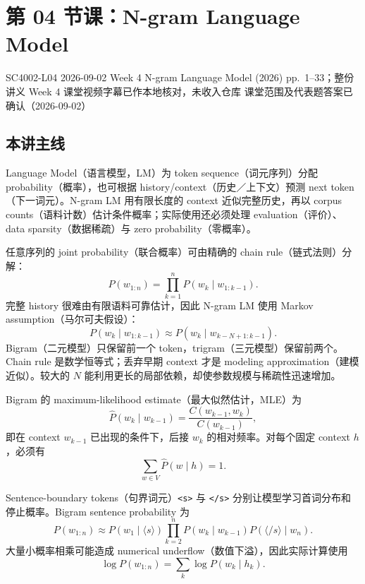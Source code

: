 
\section{第 04 节课：N-gram Language Model}
\label{lecture:SC4002-L04}

\lecturemeta
  {SC4002-L04}
  {2026-09-02}
  {Week 4 N-gram Language Model (2026)}
  {pp.~1--33；整份讲义}
  {Week 4 课堂视频字幕已作本地核对，未收入仓库}
  {课堂范围及代表题答案已确认（2026-09-02）}

\subsection{本讲主线}

Language Model（语言模型，LM）为 token sequence（词元序列）分配 probability（概率），也可根据 history/context（历史／上下文）预测 next token（下一词元）。N-gram LM 用有限长度的 context 近似完整历史，再以 corpus counts（语料计数）估计条件概率；实际使用还必须处理 evaluation（评价）、data sparsity（数据稀疏）与 zero probability（零概率）。


任意序列的 joint probability（联合概率）可由精确的 chain rule（链式法则）分解：
\[
  P(w_{1:n})=\prod_{k=1}^{n}P(w_k\mid w_{1:k-1}).
\]
完整 history 很难由有限语料可靠估计，因此 N-gram LM 使用 Markov assumption（马尔可夫假设）：
\[
  P(w_k\mid w_{1:k-1})
  \approx P(w_k\mid w_{k-N+1:k-1}).
\]
Bigram（二元模型）只保留前一个 token，trigram（三元模型）保留前两个。Chain rule 是数学恒等式；丢弃早期 context 才是 modeling approximation（建模近似）。较大的 $N$ 能利用更长的局部依赖，却使参数规模与稀疏性迅速增加。


Bigram 的 maximum-likelihood estimate（最大似然估计，MLE）为
\[
  \hat P(w_k\mid w_{k-1})
  =\frac{C(w_{k-1},w_k)}{C(w_{k-1})},
\]
即在 context $w_{k-1}$ 已出现的条件下，后接 $w_k$ 的相对频率。对每个固定 context $h$，必须有
\[
  \sum_{w\in V}\hat P(w\mid h)=1.
\]

Sentence-boundary tokens（句界词元）\texttt{<s>} 与 \texttt{</s>} 分别让模型学习首词分布和停止概率。Bigram sentence probability 为
\[
  P(w_{1:n})\approx
  P(w_1\mid\langle s\rangle)
  \prod_{k=2}^{n}P(w_k\mid w_{k-1})
  P(\langle{/}s\rangle\mid w_n).
\]
大量小概率相乘可能造成 numerical underflow（数值下溢），因此实际计算使用
\[
  \log P(w_{1:n})=\sum_k\log P(w_k\mid h_k).
\]

